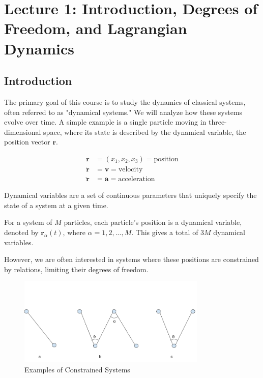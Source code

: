 \setcounter{section}{0}

\section{Lecture 1: Introduction, Degrees of Freedom, and Lagrangian Dynamics}

\subsection{Introduction}

The primary goal of this course is to study the dynamics of classical systems, often 
referred to as "dynamical systems." We will analyze how these systems evolve over time.
A simple example is a single particle moving in three-dimensional space, where its state 
is described by the dynamical variable, the position vector $\mathbf{r}$.

\begin{align*}
    \mathbf{r} &= (x_1, x_2, x_3) = \text{position} \\
    \dot{\mathbf{r}} &= \mathbf{v} = \text{velocity}\\
    \ddot{\mathbf{r}} &= \mathbf{a} = \text{acceleration}
\end{align*}

\begin{definition}
    Dynamical variables are a set of continuous parameters that uniquely specify the 
    state of a system at a given time.
\end{definition}

For a system of $M$ particles, each particle's position is a dynamical variable, denoted by $\mathbf{r}_\alpha(t)$, where $\alpha = 1, 2, ..., M$. This gives a total of $3M$ dynamical variables.

However, we are often interested in systems where these positions are constrained by relations, limiting their degrees of freedom.

\begin{figure}[ht]
  \centering
  \includegraphics[width=0.8\textwidth]{images/1-1-1.png}
  \caption{Examples of Constrained Systems}
  \label{fig:1-1-1}
\end{figure}

